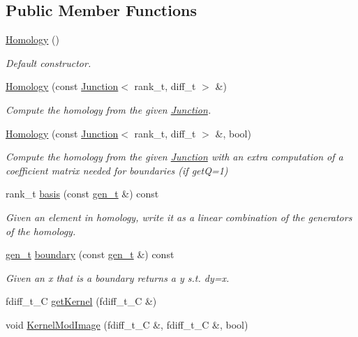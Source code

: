 \subsection*{Public Member Functions}
\begin{DoxyCompactItemize}
\item 
\hyperlink{classMackey_1_1Homology_a3580b194f986bd59a02fb84db97e00f2}{Homology} ()
\begin{DoxyCompactList}\small\item\em Default constructor. \end{DoxyCompactList}\item 
\hyperlink{classMackey_1_1Homology_a31e26f0fb8e1cd7f0506ae1dbc97ea22}{Homology} (const \hyperlink{classMackey_1_1Junction}{Junction}$<$ rank\+\_\+t, diff\+\_\+t $>$ \&)
\begin{DoxyCompactList}\small\item\em Compute the homology from the given \hyperlink{classMackey_1_1Junction}{Junction}. \end{DoxyCompactList}\item 
\hyperlink{classMackey_1_1Homology_af42f480509ef68df47308c0f506d44c8}{Homology} (const \hyperlink{classMackey_1_1Junction}{Junction}$<$ rank\+\_\+t, diff\+\_\+t $>$ \&, bool)
\begin{DoxyCompactList}\small\item\em Compute the homology from the given \hyperlink{classMackey_1_1Junction}{Junction} with an extra computation of a coefficient matrix needed for boundaries (if getQ=1) \end{DoxyCompactList}\item 
rank\+\_\+t \hyperlink{classMackey_1_1Homology_a2e6fb6da3abdba934a1eb2f4236623cb}{basis} (const \hyperlink{classMackey_1_1Homology_adf81f4293a5feba94aa734fcc8c89a46}{gen\+\_\+t} \&) const
\begin{DoxyCompactList}\small\item\em Given an element in homology, write it as a linear combination of the generators of the homology. \end{DoxyCompactList}\item 
\hyperlink{classMackey_1_1Homology_adf81f4293a5feba94aa734fcc8c89a46}{gen\+\_\+t} \hyperlink{classMackey_1_1Homology_aeb3cbf5cc7cb166e8e0a552dda57d05b}{boundary} (const \hyperlink{classMackey_1_1Homology_adf81f4293a5feba94aa734fcc8c89a46}{gen\+\_\+t} \&) const
\begin{DoxyCompactList}\small\item\em Given an x that is a boundary returns a y s.\+t. dy=x. \end{DoxyCompactList}\item 
fdiff\+\_\+t\+\_\+C \hyperlink{classMackey_1_1Homology_a72296e393c6f22a526375b0169daab94}{get\+Kernel} (fdiff\+\_\+t\+\_\+C \&)
\item 
void \hyperlink{classMackey_1_1Homology_a902c8dfef7da8ad9f5e03d16eb60a423}{Kernel\+Mod\+Image} (fdiff\+\_\+t\+\_\+C \&, fdiff\+\_\+t\+\_\+C \&, bool)
\end{DoxyCompactItemize}
